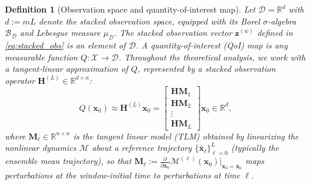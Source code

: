 \documentclass[11pt,a4paper]{article}
\newtheorem{definition}{Definition}
\begin{document}
\begin{definition}[Observation space and quantity-of-interest map]
\label{def:data_space}
Let $\mathcal{D}=\mathbb{R}^{d}$ with $d:=mL$ denote the stacked observation space, equipped with its Borel $\sigma$-algebra $\mathcal{B}_{\mathcal{D}}$ and Lebesgue measure $\mu_{\mathcal{D}}$. The stacked observation vector $\mathbf{z}^{(w)}$ defined in \eqref{eq:stacked_obs} is an element of $\mathcal{D}$. A quantity-of-interest (QoI) map is any measurable function $Q:\mathcal{X}\to\mathcal{D}$. Throughout the theoretical analysis, we work with a tangent-linear approximation of $Q$, represented by a stacked observation operator $\mathbf{H}^{(L)}\in\mathbb{R}^{d\times n}$:
\begin{equation}
Q(\mathbf{x}_0)\approx\mathbf{H}^{(L)}\mathbf{x}_0
=
\begin{bmatrix}
\mathbf{H}\mathbf{M}_1\\
\mathbf{H}\mathbf{M}_2\\
\vdots\\
\mathbf{H}\mathbf{M}_L
\end{bmatrix}
\mathbf{x}_0
\in\mathbb{R}^{d},
\end{equation}
where $\mathbf{M}_\ell\in\mathbb{R}^{n\times n}$ is the tangent linear model (TLM) obtained by linearizing the nonlinear dynamics $\mathcal{M}$ about a reference trajectory $\{\bar{\mathbf{x}}_\ell\}_{\ell=0}^{L}$ (typically the ensemble mean trajectory), so that $\mathbf{M}_\ell := \frac{\partial}{\partial\mathbf{x}_0}\mathcal{M}^{(\ell)}(\mathbf{x}_0)\big|_{\mathbf{x}_0=\bar{\mathbf{x}}_0}$ maps perturbations at the window-initial time to perturbations at time $\ell$. 
\end{definition}
\end{document}

